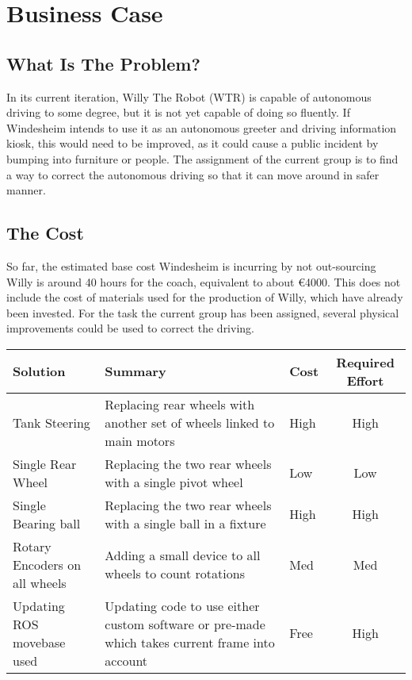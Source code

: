 \section{Business Case}


\subsection{What Is The Problem?}
In its current iteration, Willy The Robot (WTR) is capable of autonomous driving to some degree, but it is not yet capable of doing so fluently.
If Windesheim intends to use it as an autonomous greeter and driving information kiosk, this would need to be improved, as it could cause a public incident by bumping into furniture or people.
The assignment of the current group is to find a way to correct the autonomous driving so that it can move around in safer manner.

\subsection{The Cost}
So far, the estimated base cost Windesheim is incurring by not out-sourcing Willy is around 40 hours for the coach, equivalent to about \euro 4000.
This does not include the cost of materials used for the production of Willy, which have already been invested.
For the task the current group has been assigned, several physical improvements could be used to correct the driving.

\begin{tabular}{|L{3cm}|L{6cm}|l|c|}
\hline
Solution		  & Summary 															  & Cost 	&Required Effort \\ \hline
Tank Steering & Replacing rear wheels with another set of wheels linked to main motors & High 	& High			\\ \hline
Single Rear Wheel & Replacing the two rear wheels with a single pivot wheel 		    	  & Low		& Low			\\ \hline
Single Bearing ball & Replacing the two rear wheels with a single ball in a fixture   & High  	& High			\\ \hline
Rotary Encoders on all wheels & Adding a small device to all wheels to count rotations & Med   	& Med			\\ \hline
Updating ROS movebase used & Updating code to use either custom software or pre-made which takes current frame into account & Free & High \\ \hline
\end{tabular}


